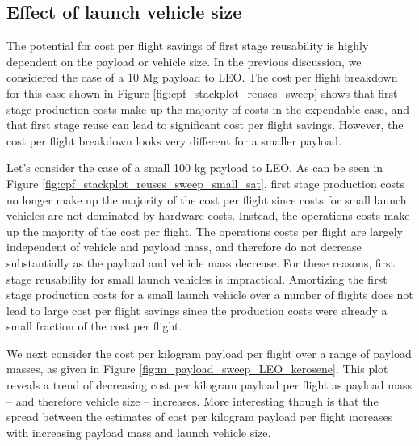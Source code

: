 \documentclass[conf]{new-aiaa}
\begin{document}
\begin{multicols}{2}
\subsection{Effect of launch vehicle size}


The potential for cost per flight savings of first stage reusability is highly dependent on the payload or vehicle size. In the previous discussion, we considered the case of a 10 Mg payload to LEO. The cost per flight breakdown for this case shown in Figure \ref{fig:cpf_stackplot_reuses_sweep} shows that first stage production costs make up the majority of costs in the expendable case, and that first stage reuse can lead to significant cost per flight savings. However, the cost per flight breakdown looks very different for a smaller payload. 

Let's consider the case of a small 100 kg payload to LEO. As can be seen in Figure \ref{fig:cpf_stackplot_reuses_sweep_small_sat}, first stage production costs no longer make up the majority of the cost per flight since costs for small launch vehicles are not dominated by hardware costs. Instead, the operations costs make up the majority of the cost per flight. The operations costs per flight are largely independent of vehicle and payload mass, and therefore do not decrease substantially as the payload and vehicle mass decrease. For these reasons, first stage reusability for small launch vehicles is impractical. Amortizing the first stage production costs for a small launch vehicle over a number of flights does not lead to large cost per flight savings since the production costs were already a small fraction of the cost per flight.

We next consider the cost per kilogram payload per flight over a range of payload masses, as given in Figure \ref{fig:m_payload_sweep_LEO_kerosene}. This plot reveals a trend of decreasing cost per kilogram payload per flight as payload mass -- and therefore vehicle size -- increases. More interesting though is that the spread between the estimates of cost per kilogram payload per flight increases with increasing payload mass and launch vehicle size. 


\end{multicols}
\end{document}
